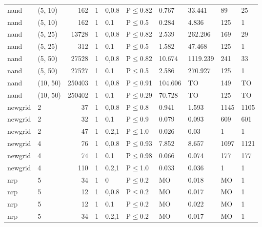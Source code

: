 \begin{longtable}{llrrllllll}
 nand          & (5, 10)  &    	162 & 1 & 0,0.8 & P$\leq$0.82  & 0.767   & 33.441   & 89     & 25     \\
 nand          & (5, 10)  &    	162 & 1 & 0.1   & P$\leq$0.5   & 0.284   & 4.836    & 125    & 1      \\
 nand          & (5, 25)  &  	13728 & 1 & 0,0.8 & P$\leq$0.82  & 2.539   & 262.206  & 169    & 29     \\
 nand          & (5, 25)  &    	312 & 1 & 0.1   & P$\leq$0.5   & 1.582   & 47.468   & 125    & 1      \\
 nand          & (5, 50)  &  	27528 & 1 & 0,0.8 & P$\leq$0.82  & 10.674  & 1119.239 & 241    & 33     \\
 nand          & (5, 50)  &  	27527 & 1 & 0.1   & P$\leq$0.5   & 2.586   & 270.927  & 125    & 1      \\
 nand          & (10, 50) & 	250403 & 1 & 0,0.8 & P$\leq$0.91  & 104.606 & TO       & 149    & TO     \\
 nand          & (10, 50) & 	250402 & 1 & 0.1   & P$\leq$0.29  & 70.728  & TO       & 125    & TO     \\
 newgrid       & 2        &     	37 & 1 & 0,0.8 & P$\leq$0.8   & 0.941   & 1.593    & 1145   & 1105   \\
 newgrid       & 2        &     	32 & 1 & 0.1   & P$\leq$0.9   & 0.079   & 0.093    & 609    & 601    \\
 newgrid       & 2        &     	47 & 1 & 0.2,1 & P$\leq$1.0   & 0.026   & 0.03     & 1      & 1      \\
 newgrid       & 4        &     	76 & 1 & 0,0.8 & P$\leq$0.93  & 7.852   & 8.657    & 1097   & 1121   \\
 newgrid       & 4        &     	74 & 1 & 0.1   & P$\leq$0.98  & 0.066   & 0.074    & 177    & 177    \\
 newgrid       & 4        &    	110 & 1 & 0.2,1 & P$\leq$1.0   & 0.033   & 0.036    & 1      & 1      \\
 nrp           & 5        &     	34 & 1 & 0     & P$\leq$0.2   & MO      & 0.018    & MO     & 1      \\
 nrp           & 5        &     	12 & 1 & 0,0.8 & P$\leq$0.2   & MO      & 0.017    & MO     & 1      \\
 nrp           & 5        &     	12 & 1 & 0.1   & P$\leq$0.2   & MO      & 0.022    & MO     & 1      \\
 nrp           & 5        &     	34 & 1 & 0.2,1 & P$\leq$0.2   & MO      & 0.017    & MO     & 1      \\

\end{longtable}
